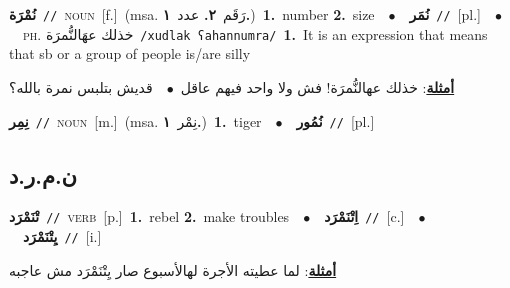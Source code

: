 \documentclass[10pt,a4paper,twoside]{article} %
\begin{document}
\begin{multicols}{2}
{\setlength\topsep{0pt}\textbf{\foreignlanguage{arabic}{نُمْرَة}}\ {\color{gray}\texttt{//}\color{black}}\ \textsc{noun}\ [f.]\ \color{gray}(msa. \foreignlanguage{arabic}{رَقَم}~\foreignlanguage{arabic}{\textbf{٢.}}  \foreignlanguage{arabic}{عدد}~\foreignlanguage{arabic}{\textbf{١.}})\color{black}\ \textbf{1.}~number  \textbf{2.}~size\ \ $\bullet$\ \ \setlength\topsep{0pt}\textbf{\foreignlanguage{arabic}{نُمَر}}\ {\color{gray}\texttt{//}\color{black}}\ [pl.]\ \ $\bullet$\ \ \textsc{ph.} \color{gray} \foreignlanguage{arabic}{خذلك عهَالنُّمرَة}\color{black}\ {\color{gray}\texttt{/{\sffamily xudlak ʕahannumra}/}\color{black}}\ \textbf{1.}~It is an expression that means that sb or a group of people is/are silly\  \begin{flushright}\color{gray}\foreignlanguage{arabic}{\textbf{\underline{\foreignlanguage{arabic}{أمثلة}}}: خذلك عهالنُّمرَة! فش ولا واحد  فيهم عاقل\ $\bullet$\ \  قديش بتلبس نمرة بالله؟}\end{flushright}\color{black}} \vspace{2mm}

{\setlength\topsep{0pt}\textbf{\foreignlanguage{arabic}{نِمِر}}\ {\color{gray}\texttt{//}\color{black}}\ \textsc{noun}\ [m.]\ \color{gray}(msa. \foreignlanguage{arabic}{نِمْر}~\foreignlanguage{arabic}{\textbf{١.}})\color{black}\ \textbf{1.}~tiger\ \ $\bullet$\ \ \setlength\topsep{0pt}\textbf{\foreignlanguage{arabic}{نُمُور}}\ {\color{gray}\texttt{//}\color{black}}\ [pl.]\ } \vspace{2mm}

\vspace{-3mm}
\subsection*{\color{blue}\foreignlanguage{arabic}{ن.م.ر.د}\color{blue}{}} 

{\setlength\topsep{0pt}\textbf{\foreignlanguage{arabic}{تْنَمْرَد}}\ {\color{gray}\texttt{//}\color{black}}\ \textsc{verb}\ [p.]\ \textbf{1.}~rebel  \textbf{2.}~make troubles\ \ $\bullet$\ \ \setlength\topsep{0pt}\textbf{\foreignlanguage{arabic}{اِتْنَمْرَد}}\ {\color{gray}\texttt{//}\color{black}}\ [c.]\ \ $\bullet$\ \ \setlength\topsep{0pt}\textbf{\foreignlanguage{arabic}{يِتْنَمْرَد}}\ {\color{gray}\texttt{//}\color{black}}\ [i.]\  \begin{flushright}\color{gray}\foreignlanguage{arabic}{\textbf{\underline{\foreignlanguage{arabic}{أمثلة}}}: لما عطيته الأجرة لهالأسبوع صار يِتْنَمْرَد مش عاجبه}\end{flushright}\color{black}} \vspace{2mm}


\end{multicols}
\end{document}
